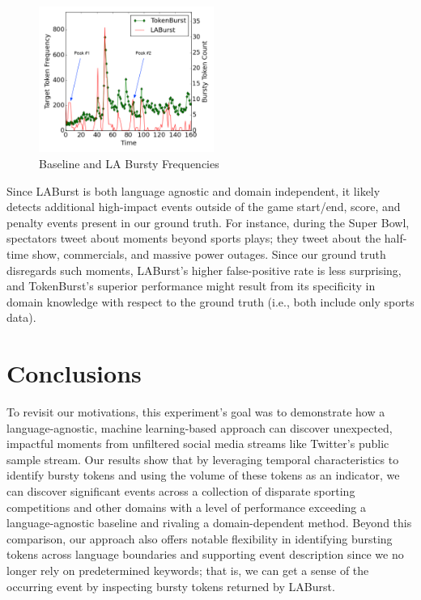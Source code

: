 \documentclass[letterpaper]{article}
\begin{document}
\begin{figure}[hbtp]
\begin{center}
\includegraphics[width=2.25in]{./figures/wc0713freq-labeled.png}
\caption{Baseline and LA Bursty Frequencies}
\label{fig:worldCupFreqs}
\end{center}
\end{figure}

Since LABurst is both language agnostic and domain independent, it likely detects additional high-impact events outside of the game start/end, score, and penalty events present in our ground truth.
For instance, during the Super Bowl, spectators tweet about moments beyond sports plays; they tweet about the half-time show, commercials, and massive power outages.
Since our ground truth disregards such moments, LABurst's higher false-positive rate is less surprising, and TokenBurst's superior performance might result from its specificity in domain knowledge with respect to the ground truth (i.e., both include only sports data).

\section{Conclusions}
\label{sect:conlusions}

To revisit our motivations, this experiment's goal was to demonstrate how a language-agnostic, machine learning-based approach can discover unexpected, impactful moments from unfiltered social media streams like Twitter's public sample stream.
Our results show that by leveraging temporal characteristics to identify bursty tokens and using the volume of these tokens as an indicator, we can discover significant events across a collection of disparate sporting competitions and other domains with a level of performance exceeding a language-agnostic baseline and rivaling a domain-dependent method.
Beyond this comparison, our approach also offers notable flexibility in identifying bursting tokens  across language boundaries and supporting event description since we no longer rely on predetermined keywords; that is, we can get a sense of the occurring event by inspecting bursty tokens returned by LABurst.
\end{document}
